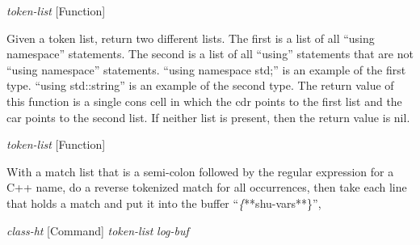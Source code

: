 \vspace{1em}
\noindent
{}
\usebox{\funcname}\emph{token-list}
 \hfill [Function]

\begin{doc-string}
Given a token list, return two different lists.  The first is a list of all
``using namespace'' statements.  The second is a list of all ``using''
statements that are not ``using namespace'' statements.  ``using namespace
std;'' is an example of the first type.  ``using std::string'' is an example of
the second type.
The return value of this function is a single cons cell in which the cdr points
to the first list and the car points to the second list.
If neither list is present, then the return value is nil.
\end{doc-string}

\vspace{1em}
\noindent
{}
\usebox{\funcname}\emph{token-list}
 \hfill [Function]

\begin{doc-string}
With a match list that is a semi-colon followed by the regular expression for
a C++ name, do a reverse tokenized match for all occurrences, then take each line
that holds a match and put it into the buffer ``\emph\{**shu-vars**\}'',
\end{doc-string}

\vspace{1em}
\noindent
{}
\usebox{\funcname}\emph{class-ht}
 \hfill [Command]
\hspace*{\wd\funcname}\emph{token-list}
\hspace*{\wd\funcname}\emph{log-buf}

